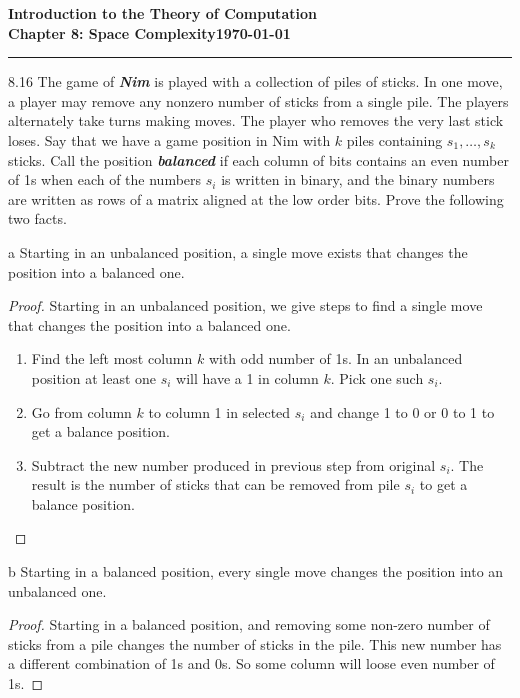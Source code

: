 \documentclass[11pt]{article}
\newcommand{\dated}{\today}
\begin{document}
\textbf{Introduction to the Theory of
Computation}\hfill\textbf{\myname}\\[0.01in]
\textbf{Chapter 8: Space Complexity}\hfill\textbf{\dated}\\
\smallskip\hrule\bigskip

\begin{problem}{8.16}
The game of \textbf{\textit{Nim}} is played with a collection of piles of sticks. In one move, a player may remove any nonzero number of sticks from a single pile. The players alternately take turns making moves. The player who removes the very last stick loses. Say that we have a game position in Nim with $k$ piles containing $s_1, \ldots ,s_k$ sticks. Call the position \textbf{\textit{balanced}} if each column of bits contains an even number of 1s when each of the numbers $s_i$ is written in binary, and the binary numbers are written as rows of a matrix aligned at the low order bits. Prove the following two facts.
\end{problem}

\begin{problem}[Part]{a}
Starting in an unbalanced position, a single move exists that changes the position into a balanced one.
\end{problem}

\begin{proof}
Starting in an unbalanced position, we give steps to find a single move that changes the position into a balanced one.
\begin{enumerate}
\item Find the left most column $k$ with odd number of 1s. In an unbalanced position at least one $s_i$ will have a 1 in column $k$. Pick one such $s_i$.
\item Go from column $k$ to column 1 in selected $s_i$ and change 1 to 0 or 0 to 1 to get a balance position.
\item Subtract the new number produced in previous step from original $s_i$. The result is the number of sticks that can be removed from pile $s_i$ to get a balance position.
\end{enumerate}
\end{proof}

\begin{problem}[Part]{b}
Starting in a balanced position, every single move changes the position into an unbalanced one.
\end{problem}

\begin{proof}
Starting in a balanced position, and removing some non-zero number of sticks from a pile changes the number of sticks in the pile. This new number has a different combination of 1s and 0s. So some column will loose even number of 1s.
\end{proof}
\end{document}
